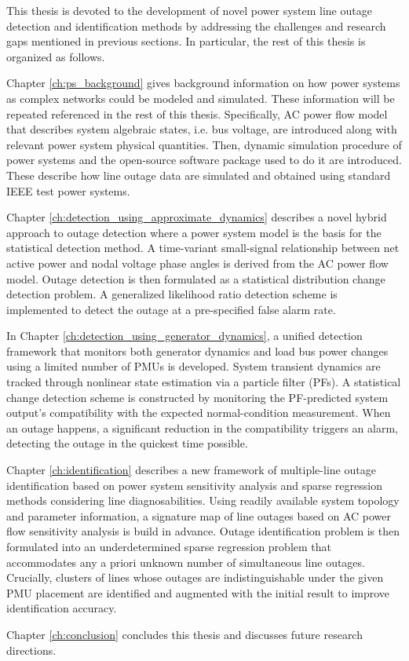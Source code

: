 This thesis is devoted to the development of novel power system line outage detection and identification methods by addressing the challenges and research gaps mentioned in previous sections. In particular, the rest of this thesis is organized as follows.

Chapter \ref{ch:ps_background} gives background information on how power systems as complex networks could be modeled and simulated. These information will be repeated referenced in the rest of this thesis. Specifically, AC power flow model that describes system algebraic states, i.e. bus voltage, are introduced along with relevant power system physical quantities. Then, dynamic simulation procedure of power systems and the open-source software package used to do it are introduced. These describe how line outage data are simulated and obtained using standard IEEE test power systems. 

Chapter \ref{ch:detection_using_approximate_dynamics} describes a novel hybrid approach to outage detection where a power system model is the basis for the statistical detection method. A time-variant small-signal relationship between net active power and nodal voltage phase angles is derived from the AC power flow model. Outage detection is then formulated as a statistical distribution change detection problem. A generalized likelihood ratio detection scheme is implemented to detect the outage at a pre-specified false alarm rate. 

In Chapter \ref{ch:detection_using_generator_dynamics}, a unified detection framework that monitors both generator dynamics and load bus power changes using a limited number of PMUs is developed. System transient dynamics are tracked through nonlinear state estimation via a particle filter (PFs). A statistical change detection scheme is constructed by monitoring the PF-predicted system output's compatibility with the expected normal-condition measurement. When an outage happens, a significant reduction in the compatibility triggers an alarm, detecting the outage in the quickest time possible. 

Chapter \ref{ch:identification} describes a new framework of multiple-line outage identification based on power system sensitivity analysis and sparse regression methods considering line diagnosabilities. Using readily available system topology and parameter information, a signature map of line outages based on AC power flow sensitivity analysis is build in advance. Outage identification problem is then formulated into an underdetermined sparse regression problem that accommodates any a priori unknown number of simultaneous line outages. Crucially, clusters of lines whose outages are indistinguishable under the given PMU placement are identified and augmented with the initial result to improve identification accuracy. 

Chapter \ref{ch:conclusion} concludes this thesis and discusses future research directions.
